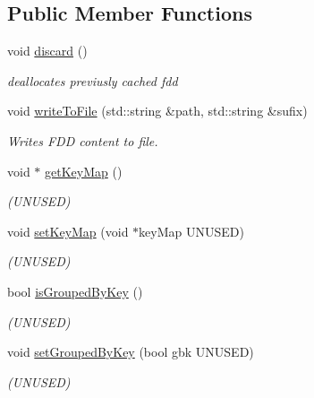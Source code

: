 \subsection*{Public Member Functions}
\begin{DoxyCompactItemize}
\item 
void \hyperlink{group__memmodel_ga0addecf1c27311b6da3e37f77e414572}{discard} ()
\begin{DoxyCompactList}\small\item\em deallocates previusly cached fdd \end{DoxyCompactList}\item 
void \hyperlink{classfaster_1_1fddCore_a9504c32481c67c2ceaf98d132ef37ee6}{write\+To\+File} (std\+::string \&path, std\+::string \&sufix)
\begin{DoxyCompactList}\small\item\em Writes F\+DD content to file. \end{DoxyCompactList}\item 
\hypertarget{classfaster_1_1fddCore_a7dcd1b146c23c5f5ba149a6fc2bc7741}{}\label{classfaster_1_1fddCore_a7dcd1b146c23c5f5ba149a6fc2bc7741} 
void $\ast$ \hyperlink{classfaster_1_1fddCore_a7dcd1b146c23c5f5ba149a6fc2bc7741}{get\+Key\+Map} ()
\begin{DoxyCompactList}\small\item\em (U\+N\+U\+S\+ED) \end{DoxyCompactList}\item 
\hypertarget{classfaster_1_1fddCore_ae268b85e9f217e3942600c11b8aa3347}{}\label{classfaster_1_1fddCore_ae268b85e9f217e3942600c11b8aa3347} 
void \hyperlink{classfaster_1_1fddCore_ae268b85e9f217e3942600c11b8aa3347}{set\+Key\+Map} (void $\ast$key\+Map U\+N\+U\+S\+ED)
\begin{DoxyCompactList}\small\item\em (U\+N\+U\+S\+ED) \end{DoxyCompactList}\item 
\hypertarget{classfaster_1_1fddCore_a4ff77df4fb389f5ee6ff468f773d58f8}{}\label{classfaster_1_1fddCore_a4ff77df4fb389f5ee6ff468f773d58f8} 
bool \hyperlink{classfaster_1_1fddCore_a4ff77df4fb389f5ee6ff468f773d58f8}{is\+Grouped\+By\+Key} ()
\begin{DoxyCompactList}\small\item\em (U\+N\+U\+S\+ED) \end{DoxyCompactList}\item 
\hypertarget{classfaster_1_1fddCore_a9a47c562a1f92f6c7f79968beb339c3d}{}\label{classfaster_1_1fddCore_a9a47c562a1f92f6c7f79968beb339c3d} 
void \hyperlink{classfaster_1_1fddCore_a9a47c562a1f92f6c7f79968beb339c3d}{set\+Grouped\+By\+Key} (bool gbk U\+N\+U\+S\+ED)
\begin{DoxyCompactList}\small\item\em (U\+N\+U\+S\+ED) \end{DoxyCompactList}\end{DoxyCompactItemize}
